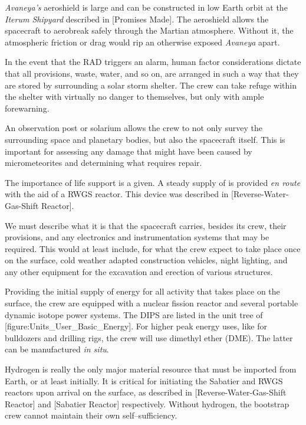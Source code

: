 
{\it Avaneya's} aeroshield is large and can be constructed in low Earth orbit at the {\it Iterum Shipyard} described in [Promises Made]. The aeroshield allows the spacecraft to aerobreak safely through the Martian atmosphere. Without it, the atmospheric friction or drag would rip an otherwise exposed {\it Avaneya} apart.

In the event that the RAD triggers an alarm, human factor considerations dictate that all provisions, waste, water, and so on, are arranged in such a way that they are stored by surrounding a solar storm shelter. The crew can take refuge within the shelter with virtually no danger to themselves, but only with ample forewarning.

An observation post or solarium allows the crew to not only survey the surrounding space and planetary bodies, but also the spacecraft itself. This is important for assessing any damage that might have been caused by micrometeorites and determining what requires repair.

The importance of life support is a given. A steady supply of  is provided {\it en route} with the aid of a RWGS reactor. This device was described in [Reverse-Water-Gas-Shift Reactor].

We must describe what it is that the spacecraft carries, besides its crew, their provisions, and any electronics and instrumentation systems that may be required. This would at least include, for what the crew expect to take place once on the surface, cold weather adapted construction vehicles, night lighting, and any other equipment for the excavation and erection of various structures. 

Providing the initial supply of energy for all activity that takes place on the surface, the crew are equipped with a nuclear fission reactor and several portable dynamic isotope power systems. The DIPS are listed in the unit tree of [figure:Units_User_Basic_Energy]. For higher peak energy uses, like for bulldozers and drilling rigs, the crew will use dimethyl ether  (DME). The latter can be manufactured {\it in situ}.

Hydrogen is really the only major material resource that must be imported from Earth, or at least initially.  It is critical for initiating the Sabatier and RWGS reactors upon arrival on the surface, as described in [Reverse-Water-Gas-Shift Reactor] and [Sabatier Reactor] respectively. Without hydrogen, the bootstrap crew cannot maintain their own self--sufficiency. 

